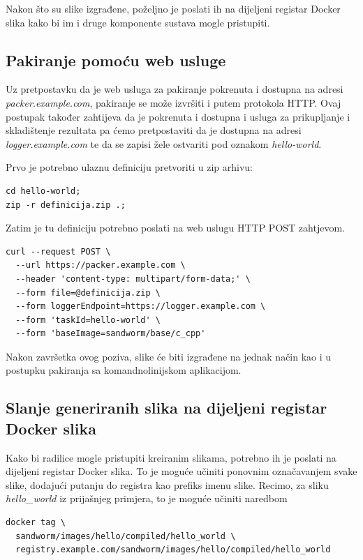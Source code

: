\documentclass[times, utf8, zavrsni]{fer}
\begin{document}
{{{\begin{appendices}
Nakon što su slike izgrađene, poželjno je poslati ih na dijeljeni registar Docker slika kako bi im i druge komponente sustava mogle pristupiti.

\subsection{Pakiranje pomoću web usluge}

Uz pretpostavku da je web usluga za pakiranje pokrenuta i dostupna na adresi {\textit{packer.example.com}}, pakiranje se može izvršiti i putem protokola HTTP. Ovaj postupak također zahtijeva da je pokrenuta i dostupna i usluga za prikupljanje i skladištenje rezultata pa ćemo pretpostaviti da je dostupna na adresi {\textit{logger.example.com}} te da se zapisi žele ostvariti pod oznakom {\textit{hello-world}}.

Prvo je potrebno ulaznu definiciju pretvoriti u zip arhivu:

\begin{lstlisting}
cd hello-world;
zip -r definicija.zip .;
\end{lstlisting}

Zatim je tu definiciju potrebno poslati na web uslugu HTTP POST zahtjevom.

\begin{lstlisting}
curl --request POST \
  --url https://packer.example.com \
  --header 'content-type: multipart/form-data;' \
  --form file=@definicija.zip \
  --form loggerEndpoint=https://logger.example.com \
  --form 'taskId=hello-world' \
  --form 'baseImage=sandworm/base/c_cpp'
\end{lstlisting}

Nakon završetka ovog poziva, slike će biti izgrađene na jednak način kao i u postupku pakiranja sa komandnolinijskom aplikacijom.

\subsection{Slanje generiranih slika na dijeljeni registar Docker slika}

Kako bi radilice mogle pristupiti kreiranim slikama, potrebno ih je poslati na dijeljeni registar Docker slika. To je moguće učiniti ponovnim označavanjem svake slike, dodajući putanju do registra kao prefiks imenu slike. Recimo, za sliku {\textit{hello\_world}} iz prijašnjeg primjera, to je moguće učiniti naredbom

\begin{lstlisting}
docker tag \
  sandworm/images/hello/compiled/hello_world \
  registry.example.com/sandworm/images/hello/compiled/hello_world
\end{lstlisting}


\end{appendices}}}}
\end{document}
